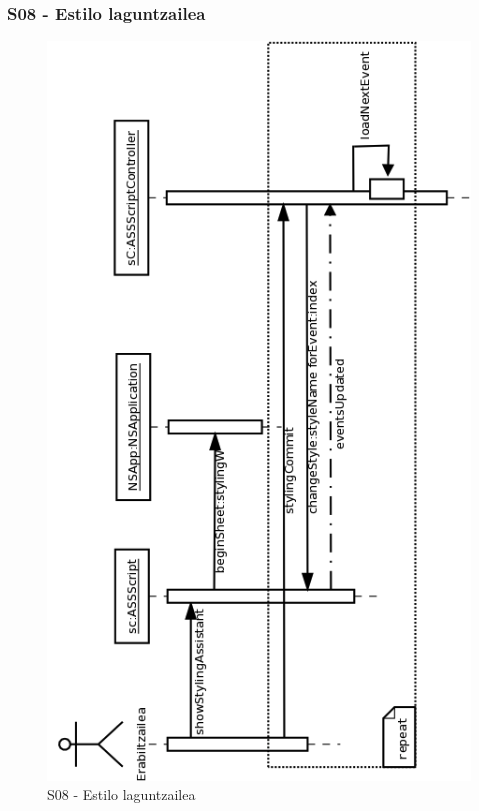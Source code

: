\subsubsection{S08 - Estilo laguntzailea}
\begin{figure}[htp]
\begin{center}
\includegraphics[scale=0.4]{Pictures/Chapter4/Diseinua/S08.png}
\caption{S08 - Estilo laguntzailea}
\label{s08d}
\end{center}
\end{figure}

\newpage

